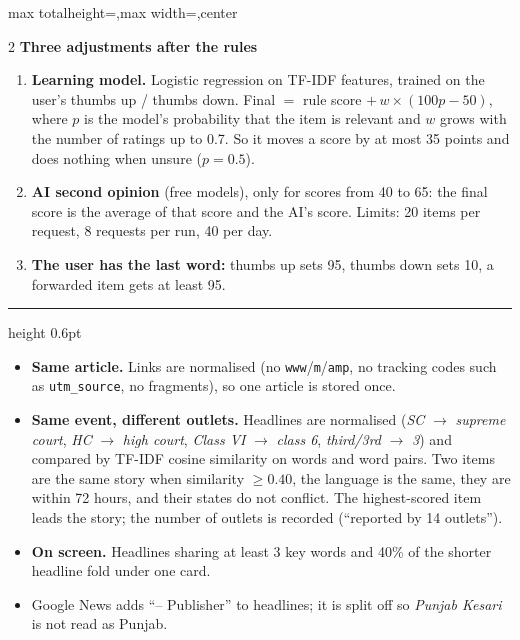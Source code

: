 \documentclass[8pt,a4paper]{extarticle}
\newcommand{\stage}[2]{\vspace{5pt}{\large\bfseries{\color{accent}Stage #1}\quad #2}\par\nobreak\vspace{1pt}%
  {\color{accent}\hrule height 0.6pt}\nobreak\vspace{3pt}}
\newcommand{\kw}[1]{\textit{#1}}
\newcommand{\lbl}[1]{\textbf{#1}}
\begin{document}
\begin{adjustbox}{max totalheight=\textheight,max width=\textwidth,center}
\begin{minipage}{\textwidth}
\begin{multicols}{2}
\vspace{2pt}
\lbl{Three adjustments after the rules}
\begin{enumerate}
  \item \lbl{Learning model.} Logistic regression on TF-IDF features, trained on the user's thumbs up / thumbs
        down. Final $=$ rule score $+\, w \times (100p - 50)$, where $p$ is the model's probability that the item
        is relevant and $w$ grows with the number of ratings up to 0.7. So it moves a score by at most 35 points
        and does nothing when unsure ($p = 0.5$).
  \item \lbl{AI second opinion} (free models), only for scores from 40 to 65: the final score is the average of
        that score and the AI's score. Limits: 20 items per request, 8 requests per run, 40 per day.
  \item \lbl{The user has the last word:} thumbs up sets 95, thumbs down sets 10, a forwarded item gets at least 95.
\end{enumerate}

\stage{4}{Duplicates}
\begin{itemize}
  \item \lbl{Same article.} Links are normalised (no \texttt{www}/\texttt{m}/\texttt{amp}, no tracking codes such as
        \texttt{utm\_source}, no fragments), so one article is stored once.
  \item \lbl{Same event, different outlets.} Headlines are normalised (\kw{SC} $\rightarrow$ \kw{supreme court},
        \kw{HC} $\rightarrow$ \kw{high court}, \kw{Class VI} $\rightarrow$ \kw{class 6}, \kw{third/3rd}
        $\rightarrow$ \kw{3}) and compared by TF-IDF cosine similarity on words and word pairs. Two items are the
        same story when similarity $\geq 0.40$, the language is the same, they are within 72 hours, and their
        states do not conflict. The highest-scored item leads the story; the number of outlets is recorded
        (``reported by 14 outlets'').
  \item \lbl{On screen.} Headlines sharing at least 3 key words and 40\% of the shorter headline fold under one card.
  \item Google News adds ``-- Publisher'' to headlines; it is split off so \kw{Punjab Kesari} is not read as Punjab.
\end{itemize}


\end{multicols}
\end{minipage}
\end{adjustbox}
\end{document}
